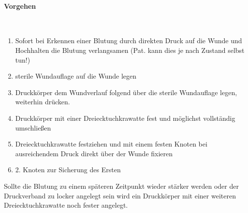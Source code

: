 \paragraph*{Vorgehen}~

\begin{enumerate}
    \item Sofort bei Erkennen einer  Blutung durch
    direkten Druck auf die Wunde und Hochhalten die Blutung verlangsamen (Pat. kann dies je
    nach Zustand selbst tun!)
    \item sterile Wundauflage auf die Wunde legen
    \item Druckkörper dem Wundverlauf folgend über die sterile
    Wundauflage legen, weiterhin drücken.
    \item Druckkörper mit einer Dreiecktuchkrawatte fest und möglichst
    vollständig umschließen
    \item Dreiecktuchkrawatte festziehen und mit einem festen Knoten bei
    ausreichendem Druck direkt über der Wunde fixieren
    \item 2. Knoten zur Sicherung des Ersten
\end{enumerate}

Sollte die Blutung zu einem späteren Zeitpunkt wieder
stärker werden oder der Druckverband zu locker angelegt
sein wird ein  Druckkörper mit einer
weiteren Dreiecktuchkrawatte noch fester angelegt. 



